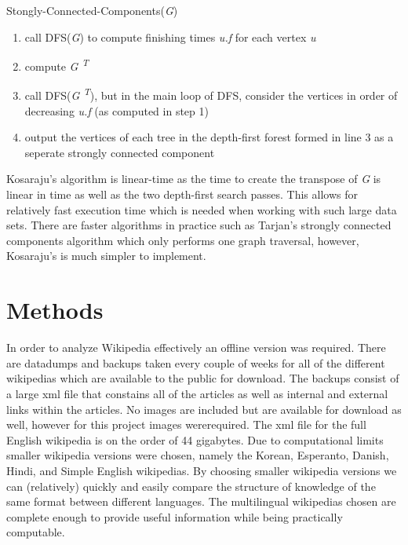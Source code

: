 \documentclass[twoside]{article}
\begin{document}
\begin{multicols}{2}
\newpage

Stongly-Connected-Components({\it G})

\begin{enumerate}

\item call DFS({\it G}) to compute finishing times {\it u.f} for each vertex {\it u}

\item compute {\it G \textsuperscript{T}}

\item call DFS({\it G \textsuperscript{T}}), but in the main loop of DFS, consider the vertices
in order of decreasing {\it u.f} (as computed in step 1)

\item output the vertices of each tree in the depth-first forest formed in line 3 as a seperate
strongly connected component

\end{enumerate}

Kosaraju's algorithm is linear-time as the time to create the transpose of {\it G} is
linear in time as well as the two depth-first search passes. This allows for relatively fast
execution time which is needed when working with such large data sets. There are faster
algorithms in practice such as Tarjan's strongly connected components algorithm which only performs
one graph traversal, however,  Kosaraju's is much simpler to implement.




\section{Methods}

In order to analyze Wikipedia effectively an offline version was required. There are datadumps
and backups taken every couple of weeks for all of the different wikipedias which are available
 to the public for download. The backups consist of a large xml file that constains all of the articles
 as well as internal and external links within the articles. No images are included but are available for download
 as well, however for this project images wererequired. The xml file for the full English wikipedia is on the order of
 44 gigabytes. Due to computational limits smaller wikipedia versions were chosen, namely the Korean, Esperanto, Danish,
Hindi, and Simple English wikipedias. By choosing smaller wikipedia versions we can (relatively) quickly and easily compare 
the structure of knowledge of the same format between different languages. The multilingual
wikipedias chosen are complete enough to provide useful information while being practically computable.


\end{multicols}
\end{document}
